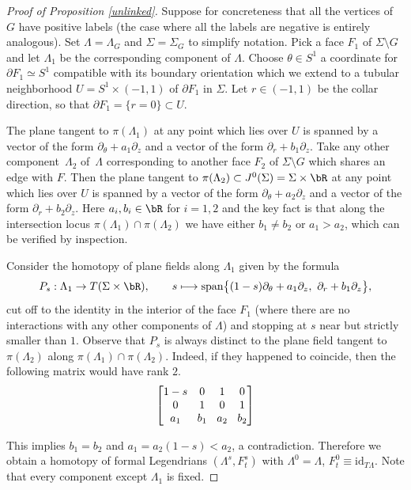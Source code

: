 \documentclass[JEP,XML,SOM,Unicode,NoFloatCountersInSection]{cedram}
\newcommand\mto{\mathchoice{\longmapsto}{\mapsto}{\mapsto}{\mapsto}}
\newcommand{\id}{\mathrm{id}}
\theoremstyle{plain}
\theoremstyle{definition}
\newcommand{\mat}[1]{\ensuremath{
\left[\begin{matrix}#1
\end{matrix}\right]
}}
\begin{document}
\begin{proof}[Proof of Proposition \ref{unlinked}]
Suppose for concreteness that all the vertices of $G$ have positive labels (the case where all the labels are negative is entirely analogous). Set $\Lambda=\Lambda_G$ and $\Sigma=\Sigma_G$ to simplify notation. Pick a face $F_1$ of $\Sigma \setminus G$ and let $\Lambda_1$ be the corresponding component of $\Lambda$. Choose $\theta \in S^1$ a coordinate for $\partial F_1 \simeq S^1$ compatible with its boundary orientation which we extend to a tubular neighborhood $U=S^1 \times (-1,1)$ of $\partial F_1$ in $\Sigma$. Let $r \in (-1,1)$ be the collar direction, so that $\partial F_1 = \{ r=0\} \subset U$.

The plane tangent to $\pi(\Lambda_1)$ at any point which lies over $U$ is spanned by a vector of the form $ \partial_\theta + a_1 \partial_z$ and a vector of the form $ \partial_r + b_1 \partial_z$. Take any other component~$\Lambda_2$ of~$\Lambda$ corresponding to another face $F_2$ of $\Sigma \setminus G$ which shares an edge with $F$. Then the plane tangent to $\pi(\Lambda_2) \subset J^0(\Sigma)=\Sigma \times \bR$ at any point which lies over $U$ is spanned by a vector of the form $ \partial_\theta + a_2 \partial_z$ and a vector of the form $ \partial_r + b_2 \partial_z$. Here $a_i,b_i \in \bR$ for $i=1,2$ and the key fact is that along the intersection locus $\pi(\Lambda_1) \cap \pi(\Lambda_2)$ we have either $b_1 \neq b_2$ or $a_1>a_2$, which can be verified by inspection.

Consider the homotopy of plane fields along $\Lambda_1$ given by the formula
\[
P_s : \Lambda_1 \to T(\Sigma \times \bR), \qquad s \mto \text{span} \big\{ (1-s)\partial_\theta + a_1\partial_z, \, \, \partial_r + b_1 \partial_z \big\},
\]
cut off to the identity in the interior of the face $F_1$ (where there are no interactions with any other components of $\Lambda$) and stopping at $s$ near but strictly smaller than $1$. Observe that $P_s$ is always distinct to the plane field tangent to $\pi(\Lambda_2)$ along $\pi(\Lambda_1) \cap \pi(\Lambda_2)$. Indeed, if they happened to coincide, then the following matrix would have rank $2$.
\[\arraycolsep4.5pt \mat{1-s & 0 & 1 & 0 \\
0 & 1 & 0 & 1 \\
a_1& b_1 &a_2 &b_2 } \]

This implies $b_1=b_2$ and $a_1=a_2(1-s)<a_2$, a contradiction. Therefore we obtain a homotopy of formal Legendrians $(\Lambda^s,F^s_t)$ with $\Lambda^0=\Lambda$, $F^0_t \equiv \id_{T \Lambda}$. Note that every component except $\Lambda_1$ is fixed.


\end{proof}
\end{document}
